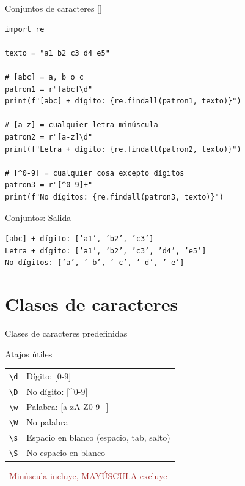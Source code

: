 \documentclass{beamer}
\begin{document}
\begin{frame}[fragile]{Conjuntos de caracteres [] \faSquare}
\begin{lstlisting}
import re

texto = "a1 b2 c3 d4 e5"

# [abc] = a, b o c
patron1 = r"[abc]\d"
print(f"[abc] + dígito: {re.findall(patron1, texto)}")

# [a-z] = cualquier letra minúscula
patron2 = r"[a-z]\d"
print(f"Letra + dígito: {re.findall(patron2, texto)}")

# [^0-9] = cualquier cosa excepto dígitos
patron3 = r"[^0-9]+"
print(f"No dígitos: {re.findall(patron3, texto)}")
\end{lstlisting}
\end{frame}

\begin{frame}[fragile]{Conjuntos: Salida \faArrowCircleRight}
\begin{tcolorbox}[colback=green!10,colframe=green,title={\small\faArrowCircleRight \ Salida},coltitle=fg0,left=3pt,right=3pt,top=3pt,bottom=3pt,boxsep=2pt]
\small\texttt{[abc] + dígito: ['a1', 'b2', 'c3']\\
Letra + dígito: ['a1', 'b2', 'c3', 'd4', 'e5']\\
No dígitos: ['a', ' b', ' c', ' d', ' e']}
\end{tcolorbox}
\end{frame}

\section{Clases de caracteres}

\begin{frame}{Clases de caracteres predefinidas \faKeyboard}
\begin{conceptbox}{Atajos útiles}
\small
\begin{tabular}{ll}
\texttt{\textbackslash d} & Dígito: [0-9] \\
\texttt{\textbackslash D} & No dígito: [\^{}0-9] \\
\texttt{\textbackslash w} & Palabra: [a-zA-Z0-9\_] \\
\texttt{\textbackslash W} & No palabra \\
\texttt{\textbackslash s} & Espacio en blanco (espacio, tab, salto) \\
\texttt{\textbackslash S} & No espacio en blanco \\
\end{tabular}
\end{conceptbox}

\vspace{0.2cm}
\begin{center}
\textcolor{brown}{\faLightbulb\ Minúscula incluye, MAYÚSCULA excluye}
\end{center}
\end{frame}
\end{document}
